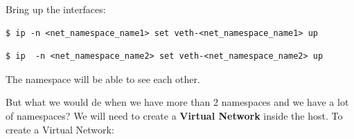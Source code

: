 \documentclass{article}
\newenvironment{codetemplate}[1][]{%
  \mybasecolorbox[#1]
  \itshape
}{%
  \endmybasecolorbox
}
\begin{document}
Bring up the interfaces:
\begin{codetemplate}{}
\begin{verbatim}
$ ip -n <net_namespace_name1> set veth-<net_namespace_name1> up
\end{verbatim}
\end{codetemplate}
\begin{codetemplate}{}
\begin{verbatim}
$ ip  -n <net_namespace_name2> set veth-<net_namespace_name2> up
\end{verbatim}
\end{codetemplate}

The namespace will be able to see each other.

But what we would de when we have more than 2 namespaces and we have a lot of namespaces? We will need to create a \textbf{Virtual Network} inside the host. To create a Virtual Network:
\end{document}
